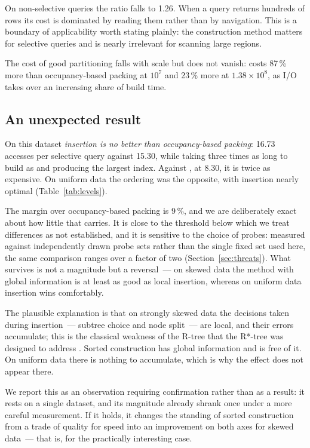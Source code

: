 On non-selective queries the ratio falls to 1.26. When a query returns hundreds
of rows its cost is dominated by reading them rather than by navigation. This is
a boundary of applicability worth stating plainly: the construction method
matters for selective queries and is nearly irrelevant for scanning large
regions.

The cost of good partitioning falls with scale but does not vanish:
 costs 87\,\% more than occupancy-based packing at $10^7$ and
23\,\% more at $1.38\times10^8$, as I/O takes over an increasing share of build
time.

\subsection{An unexpected result}
\label{sec:eval-surprise}

On this dataset \emph{insertion is no better than occupancy-based packing}:
16.73 accesses per selective query against 15.30, while taking three times as
long to build as  and producing the largest index. Against
, at 8.30, it is twice as expensive. On uniform data the
ordering was the opposite, with insertion nearly optimal
(Table~\ref{tab:levels}).

The margin over occupancy-based packing is 9\,\%, and we are deliberately
exact about how little that carries. It is close to the threshold below which we
treat differences as not established, and it is sensitive to the choice of
probes: measured against independently drawn probe sets rather than the single
fixed set used here, the same comparison ranges over a factor of two
(Section~\ref{sec:threats}). What survives is not a magnitude but a reversal~---
on skewed data the method with global information is at least as good as local
insertion, whereas on uniform data insertion wins comfortably.

The plausible explanation is that on strongly skewed data the decisions taken
during insertion~--- subtree choice and node split~--- are local, and their
errors accumulate; this is the classical weakness of the R-tree that the
R*-tree was designed to address \cite{beckmann1990rstar}. Sorted construction
has global information and is free of it. On uniform data there is nothing to
accumulate, which is why the effect does not appear there.

We report this as an observation requiring confirmation rather than as a
result: it rests on a single dataset, and its magnitude already shrank once
under a more careful measurement. If it holds, it changes
the standing of sorted construction from a trade of quality for speed into an
improvement on both axes for skewed data~--- that is, for the practically
interesting case.

